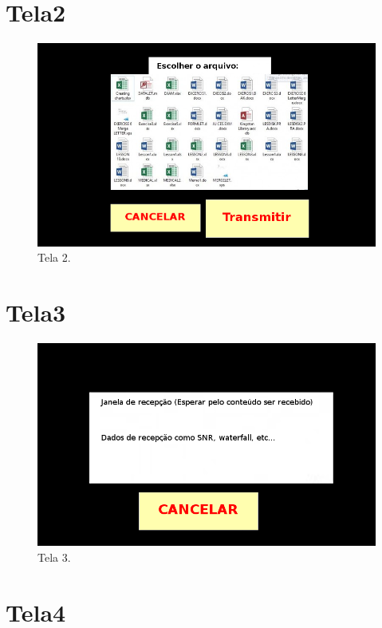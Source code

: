 \documentclass[11pt,a4paper]{article}
\begin{document}
\section{Tela2}

\begin{figure}[H]
  \centering
  \hspace*{-1.5cm}
  \includegraphics[scale=0.7]{Tela2.png}
  \caption{Tela 2.}
  \label{Tela2}
\end{figure}

\section{Tela3}

\begin{figure}[H]
  \centering
  \hspace*{-1.5cm}
  \includegraphics[scale=0.7]{Tela3.png}
  \caption{Tela 3.}
  \label{Tela3}
\end{figure}

\section{Tela4}
\end{document}

